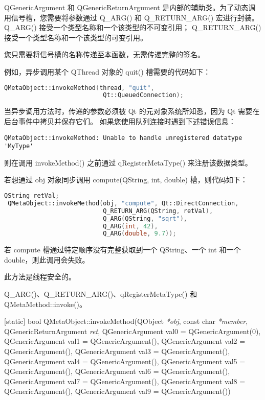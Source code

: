 QGenericArgument 和 QGenericReturnArgument 是内部的辅助类。为了动态调用信号槽，您需要将参数通过 Q\_ARG() 和 Q\_RETURN\_ARG() 宏进行封装。
Q\_ARG() 接受一个类型名称和一个该类型的不可变引用；
Q\_RETURN\_ARG() 接受一个类型名称和一个该类型的可变引用。

您只需要将信号槽的名称传递至本函数，无需传递完整的签名。

例如，异步调用某个 QThread 对象的 quit() 槽需要的代码如下：

\begin{lstlisting}[language=C++]
QMetaObject::invokeMethod(thread, "quit",
                           Qt::QueuedConnection);
\end{lstlisting}

当异步调用方法时，传递的参数必须被 Qt 的元对象系统所知悉，因为 Qt 需要在后台事件中拷贝并保存它们。
如果您使用队列连接时遇到下述错误信息：

\begin{lstlisting}
QMetaObject::invokeMethod: Unable to handle unregistered datatype 'MyType'
\end{lstlisting}

则在调用 invokeMethod() 之前通过 qRegisterMetaType() 来注册该数据类型。

若想通过 obj 对象同步调用 compute(QString, int, double) 槽，则代码如下：

\begin{lstlisting}[language=C++]
 QString retVal;
 QMetaObject::invokeMethod(obj, "compute", Qt::DirectConnection,
                           Q_RETURN_ARG(QString, retVal),
                           Q_ARG(QString, "sqrt"),
                           Q_ARG(int, 42),
                           Q_ARG(double, 9.7));
\end{lstlisting}

若 compute 槽通过特定顺序没有完整获取到一个 QString、一个 int 和一个 double，则此调用会失败。

\begin{notice}
此方法是线程安全的。
\end{notice}

\begin{seeAlso}
Q\_ARG()、Q\_RETURN\_ARG()、qRegisterMetaType() 和 QMetaMethod::invoke()。
\end{seeAlso}


[static] bool QMetaObject::invokeMethod(QObject \emph{*obj}, const char \emph{*member}, QGenericReturnArgument \emph{ret}, 
QGenericArgument val0 = QGenericArgument(0), QGenericArgument val1 = QGenericArgument(), 
QGenericArgument val2 = QGenericArgument(), 
QGenericArgument val3 = QGenericArgument(), QGenericArgument val4 = QGenericArgument(), 
QGenericArgument val5 = QGenericArgument(), QGenericArgument val6 = QGenericArgument(), 
QGenericArgument val7 = QGenericArgument(), QGenericArgument val8 = QGenericArgument(), 
QGenericArgument val9 = QGenericArgument())

